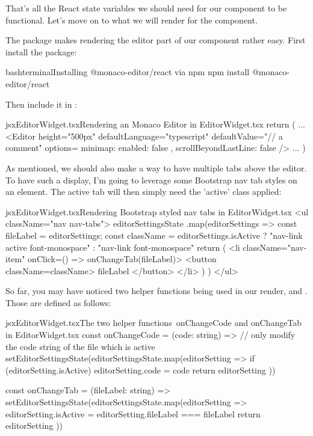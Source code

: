 \documentclass[a4paper,headinclude=on,footinclude=on,12pt,oneside]{scrbook}
\begin{document}
That's all the React state variables we should need for our component to be functional. Let's move on to what we will render for the component.


The  package makes rendering the editor part of our component rather easy. First install the package:

\begin{codeInput}{bash}{terminal}{Installing @monaco-editor/react via npm}
npm install @monaco-editor/react
\end{codeInput}

Then include it in :

\begin{codeInput}{jsx}{EditorWidget.tsx}{Rendering an Monaco Editor in EditorWidget.tsx}
return (
  ...
  <Editor
    height="500px"
    defaultLanguage="typescript"
    defaultValue={"// a comment"}
    options={{
      minimap: { enabled: false },
      scrollBeyondLastLine: false
    }}
  />
  ...
)
\end{codeInput}

As mentioned, we should also make a way to have multiple tabs above the editor. To have such a display, I'm going to leverage some Bootstrap nav tab styles on an  element. The active tab will then simply need the 'active' class applied:

\begin{codeInput}{jsx}{EditorWidget.tsx}{Rendering Bootstrap styled nav tabs in EditorWidget.tsx}
  <ul className="nav nav-tabs">
  {editorSettingsState
    .map(editorSettings => {
      const { fileLabel } = editorSettings;
      const className =
      editorSettings.isActive
          ? "nav-link active font-monospace"
          : "nav-link font-monospace"
      return (
        <li className="nav-item" onClick={() => onChangeTab(fileLabel)}>
          <button className={className}>
            {fileLabel}
          </button>
        </li>
      )
    })}
</ul>
\end{codeInput}

So far, you may have noticed two helper functions being used in our render,  and . Those are defined as follows:

\begin{codeInput}{jsx}{EditorWidget.tsx}{The two helper functions\, onChangeCode and onChangeTab in EditorWidget.tsx}
const onChangeCode = (code: string) => {
  // only modify the code string of the file which is active
  setEditorSettingsState(editorSettingsState.map(editorSetting => {
    if (editorSetting.isActive) {
      editorSetting.code = code
    }
    return editorSetting
  }))
}

const onChangeTab = (fileLabel: string) => {
  setEditorSettingsState(editorSettingsState.map(editorSetting => {
      editorSetting.isActive = editorSetting.fileLabel === fileLabel
    return editorSetting
  }))
}
\end{codeInput}
\end{document}
